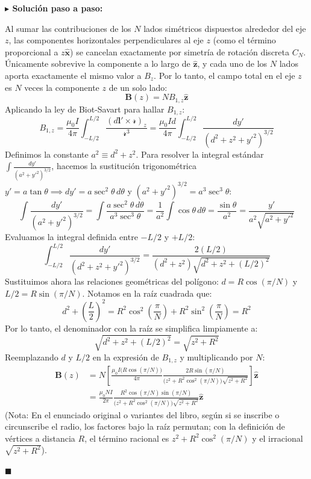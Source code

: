 \documentclass[11pt,a4paper]{book}
\newenvironment{solucion}{%
    \par\medskip\noindent\textbf{\color{blue!65!black}\Large $\blacktriangleright$ Solución paso a paso:}\par\medskip
}{%
    \hfill$\blacksquare$\par\bigskip
}
\newcommand{\xhat}{\hat{\bm{x}}}
\newcommand{\zhat}{\hat{\bm{z}}}
\newcommand{\Bvec}{\bm{B}}
\newcommand{\rsep}{\boldsymbol{\mathscr{r}}}
\begin{document}
\begin{solucion}
Al sumar las contribuciones de los $N$ lados simétricos dispuestos alrededor del eje $z$, las componentes horizontales perpendiculares al eje $z$ (como el término proporcional a $z\xhat$) se cancelan exactamente por simetría de rotación discreta $C_N$. Únicamente sobrevive la componente a lo largo de $\zhat$, y cada uno de los $N$ lados aporta exactamente el mismo valor a $B_z$. Por lo tanto, el campo total en el eje $z$ es $N$ veces la componente $z$ de un solo lado:
\begin{equation}
    \Bvec(z) = N B_{1,z} \zhat
\end{equation}
Aplicando la ley de Biot-Savart para hallar $B_{1,z}$:
\begin{equation}
    B_{1,z} = \frac{\mu_0 I}{4\pi} \int_{-L/2}^{L/2} \frac{(d\bm{l}' \times \rsep)_z}{\mathscr{r}^3} = \frac{\mu_0 I d}{4\pi} \int_{-L/2}^{L/2} \frac{dy'}{\left(d^2 + z^2 + y'^2\right)^{3/2}}
\end{equation}
Definimos la constante $a^2 \equiv d^2 + z^2$. Para resolver la integral estándar $\int \frac{dy'}{(a^2 + y'^2)^{3/2}}$, hacemos la sustitución trigonométrica $y' = a \tan\theta \implies dy' = a \sec^2\theta\,d\theta$ y $(a^2 + y'^2)^{3/2} = a^3 \sec^3\theta$:
\begin{equation}
    \int \frac{dy'}{(a^2 + y'^2)^{3/2}} = \int \frac{a\sec^2\theta\,d\theta}{a^3\sec^3\theta} = \frac{1}{a^2}\int \cos\theta\,d\theta = \frac{\sin\theta}{a^2} = \frac{y'}{a^2\sqrt{a^2 + y'^2}}
\end{equation}
Evaluamos la integral definida entre $-L/2$ y $+L/2$:
\begin{equation}
    \int_{-L/2}^{L/2} \frac{dy'}{\left(d^2 + z^2 + y'^2\right)^{3/2}} = \frac{2(L/2)}{(d^2 + z^2)\sqrt{d^2 + z^2 + (L/2)^2}}
\end{equation}
Sustituimos ahora las relaciones geométricas del polígono: $d = R\cos(\pi/N)$ y $L/2 = R\sin(\pi/N)$. Notamos en la raíz cuadrada que:
\begin{equation}
    d^2 + \left(\frac{L}{2}\right)^2 = R^2\cos^2\left(\frac{\pi}{N}\right) + R^2\sin^2\left(\frac{\pi}{N}\right) = R^2
\end{equation}
Por lo tanto, el denominador con la raíz se simplifica limpiamente a:
\begin{equation}
    \sqrt{d^2 + z^2 + (L/2)^2} = \sqrt{z^2 + R^2}
\end{equation}
Reemplazando $d$ y $L/2$ en la expresión de $B_{1,z}$ y multiplicando por $N$:
\begin{align}
    \Bvec(z) &= N \left[ \frac{\mu_0 I \big(R\cos(\pi/N)\big)}{4\pi} \frac{2 R\sin(\pi/N)}{\big(z^2 + R^2\cos^2(\pi/N)\big)\sqrt{z^2 + R^2}} \right] \zhat \nonumber \\
    &= \frac{\mu_0 N I}{2\pi} \frac{R^2 \cos(\pi/N)\sin(\pi/N)}{\big(z^2 + R^2\cos^2(\pi/N)\big)\sqrt{z^2 + R^2}} \zhat
\end{align}
(Nota: En el enunciado original o variantes del libro, según si se inscribe o circunscribe el radio, los factores bajo la raíz permutan; con la definición de vértices a distancia $R$, el término racional es $z^2 + R^2\cos^2(\pi/N)$ y el irracional $\sqrt{z^2+R^2}$).


\end{solucion}
\end{document}
